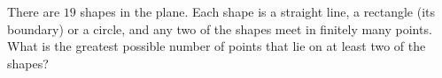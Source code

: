 There are $19$ shapes in the plane. Each shape is a straight line, a rectangle (its boundary) or a circle, and any two of the shapes meet in finitely many points. What is the greatest possible number of points that lie on at least two of the shapes?
